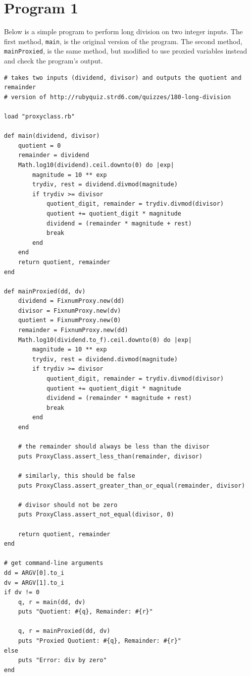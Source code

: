 \documentclass[10pt]{article}
\begin{document}
\appendix

\section{Program 1}
Below is a simple program to perform long division on two integer inputs.  The first method, \texttt{main}, is the original version of the program.  The second method, \texttt{mainProxied}, is the same method, but modified to use proxied variables instead and check the program's output.\\

\begin{verbatim}
# takes two inputs (dividend, divisor) and outputs the quotient and remainder
# version of http://rubyquiz.strd6.com/quizzes/180-long-division

load "proxyclass.rb"

def main(dividend, divisor)
	quotient = 0
	remainder = dividend
	Math.log10(dividend).ceil.downto(0) do |exp|
		magnitude = 10 ** exp
		trydiv, rest = dividend.divmod(magnitude)
		if trydiv >= divisor
			quotient_digit, remainder = trydiv.divmod(divisor)
			quotient += quotient_digit * magnitude
			dividend = (remainder * magnitude + rest)
			break
		end
	end
	return quotient, remainder
end

def mainProxied(dd, dv)
	dividend = FixnumProxy.new(dd)
	divisor = FixnumProxy.new(dv)
	quotient = FixnumProxy.new(0)
	remainder = FixnumProxy.new(dd)
	Math.log10(dividend.to_f).ceil.downto(0) do |exp|
		magnitude = 10 ** exp
		trydiv, rest = dividend.divmod(magnitude)
		if trydiv >= divisor
			quotient_digit, remainder = trydiv.divmod(divisor)
			quotient += quotient_digit * magnitude
			dividend = (remainder * magnitude + rest)
			break
		end
	end
	
	# the remainder should always be less than the divisor
	puts ProxyClass.assert_less_than(remainder, divisor)
	
	# similarly, this should be false
	puts ProxyClass.assert_greater_than_or_equal(remainder, divisor)
	
	# divisor should not be zero
	puts ProxyClass.assert_not_equal(divisor, 0)
	
	return quotient, remainder
end

# get command-line arguments
dd = ARGV[0].to_i
dv = ARGV[1].to_i
if dv != 0
	q, r = main(dd, dv)
	puts "Quotient: #{q}, Remainder: #{r}"
	
	q, r = mainProxied(dd, dv)
	puts "Proxied Quotient: #{q}, Remainder: #{r}"
else
	puts "Error: div by zero"
end
\end{verbatim}
\end{document}
